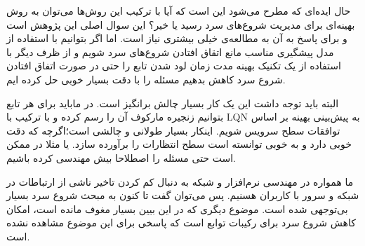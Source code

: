 حال ایده‌ای که مطرح می‌شود این است که آیا با ترکیب این روش‌ها می‌توان به روش‌ بهینه‌ای برای مدیریت شروع‌های سرد رسید یا خیر؟‌ این سوال اصلی این پژوهش است و برای پاسخ به آن به مطالعه‌ی خیلی بیشتری نیاز است. اما اگر بتوانیم با استفاده از مدل پیشگیری مناسب مانع اتقاق افتادن شروع‌های سرد شویم و از ظرف دیگر با استفاده از یک تکنیک بهینه مدت زمان لود شدن تابع را حتی در صورت اتفاق افتادن شروع سرد کاهش بدهیم مسئله را با دقت بسیار خوبی حل کرده ایم.

البته باید توجه داشت این یک کار بسیار چالش برانگیز است. در \cite{gias2020cocoa} ماباید برای هر تابع بتوانیم زنجیره مارکوف آن را رسم کرده و با ترکیب با LQN به پیش‌بینی بهینه بر اساس توافقات سطح سرویس شویم. اینکار بسیار طولانی و چالشی است؛‌اگرچه که دقت خوبی دارد و به خوبی توانسته است سطح انتظارات را برآورده سازد. یا مثلا در \cite{shahrad2020serverless} ممکن است حتی مسئله را اصطلاحا بیش‌ مهندسی کرده باشیم. 

ما همواره در مهندسی نرم‌افزار و شبکه به دنبال کم کردن تاخیر ناشی از ارتباطات در شبکه و سرور با کاربران هسنیم. پس می‌توان گفت تا کنون به مبحث شروع سرد بسیار بی‌توجهی شده است. موضوع دیگری که در این بیین بسیار مغوف مانده است، امکان کاهش شروع سرد برای رکیبات توابع است که پاسخی برای این موضوع مشاهده نشده است. 






